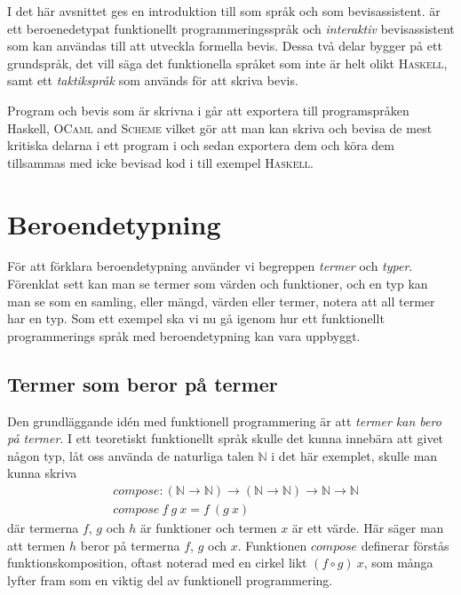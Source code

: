 I det här avsnittet ges en introduktion till \coq som språk och som
bevisassistent. \coq är ett beroenedetypat funktionellt programmeringsspråk och
\emph{interaktiv} bevisassistent som kan användas till att utveckla formella
bevis. Dessa två delar bygger på ett grundspråk, det vill säga det funktionella
språket som inte är helt olikt \textsc{Haskell}, samt ett \emph{taktikspråk}
som används för att skriva bevis.

Program och bevis som är skrivna i \coq går att exportera till programspråken
Haskell, \textsc{OCaml} and \textsc{Scheme} vilket gör att man kan skriva och
bevisa de mest kritiska delarna i ett program i \coq och sedan exportera dem
och köra dem tillsammas med icke bevisad kod i till exempel \textsc{Haskell}.

\section{Beroendetypning}
För att förklara beroendetypning använder vi begreppen \emph{termer} och
\emph{typer}. Förenklat sett kan man se termer som värden och funktioner, och
en typ kan man se som en samling, eller mängd, värden eller termer, notera att
all termer har en typ. Som ett exempel ska vi nu gå igenom hur ett funktionellt
programmerings språk med beroendetypning kan vara uppbyggt.

\subsection{Termer som beror på termer}
Den grundläggande idén med funktionell programmering är att \emph{termer kan
bero på termer}. I ett teoretiskt funktionellt språk skulle det kunna innebära
att givet någon typ, låt oss använda de naturliga talen $\mathbb{N}$ i det här
exemplet, skulle man kunna skriva
\begin{align*}
  &compose : (\mathbb{N} \to \mathbb{N}) \to (\mathbb{N} \to \mathbb{N}) \to \mathbb{N} \to \mathbb{N} \\
  &compose\ f\ g\ x = f\ (g\ x)
\end{align*}
där termerna $f$, $g$ och $h$ är funktioner och termen $x$ är ett värde. Här
säger man att termen $h$ beror på termerna $f$, $g$ och $x$. Funktionen
$compose$ definerar förstås funktionskomposition, oftast noterad med en cirkel
likt $(f \circ g)\ x$, som många lyfter fram som en viktig del av funktionell
programmering.

